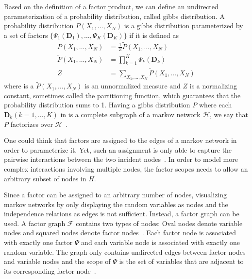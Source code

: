 Based on the definition of a \gls{factor product}, we can define an undirected parameterization of a \gls{probability distribution}, called \gls{gibbs distribution}.
A \gls{probability distribution} $P(X_1,\dots,X_N)$ is a \gls{gibbs distribution} parameterized by a set of \glspl{factor} $\{\Psi_1(\bm{D}_1),\dots,\Psi_K(\bm{D}_K)\}$ if it is defined as~\citep{koller2009probabilistic}
\begin{equation}
  \label{equ:gibbs-distribution}
  \begin{split}
  P(X_1,\dots,X_N) & =\frac{1}{Z}\tilde{P}(X_1,\dots,X_N) \\
  \tilde{P}(X_1,\dots,X_N) & =\prod_{k=1}^{K}\Psi_k(\bm{D}_k) \\
  Z & =\sum_{X_1,\ldots,X_N}\tilde{P}(X_1,\dots,X_N)
  \end{split}
\end{equation}
where is a $\tilde{P}(X_1,\dots,X_N)$ is an unnormalized measure and $Z$ is a normalizing constant, sometimes called the \gls{partitioning function}, which guarantees that the \gls{probability distribution} sums to 1.
Having a \gls{gibbs distribution} $P$ where each $\bm{D}_k(k=1,\dots,K)$ in  is a complete subgraph of a \gls{markov network} $\mathcal{H}$, we say that $P$ factorizes over $\mathcal{H}$~\citep{koller2009probabilistic}.

One could think that \glspl{factor} are assigned to the edges of a \gls{markov network} in order to parameterize it.
Yet, such an assignment is only able to capture the pairwise interactions between the two incident nodes~\citep{koller2009probabilistic}.
In order to model more complex interactions involving multiple nodes, the \glspl{factor scope} needs to allow an arbitrary subset of nodes in $H$.

Since a factor can be assigned to an arbitrary number of nodes, visualizing \glspl{markov network} by only displaying the random variables as nodes and the independence relations as edges is not sufficient.
Instead, a \gls{factor graph} can be used.
A \gls{factor graph} $\mathcal{F}$ contains two types of nodes: Oval nodes denote variable nodes and squared nodes denote factor nodes~\citep{koller2009probabilistic}.
Each factor node is associated with exactly one factor $\Psi$ and each variable node is associated with exactly one random variable.
The graph only contains undirected edges between factor nodes and variable nodes and the scope of $\Psi$ is the set of variables that are adjacent to its corresponding factor node~\citep{koller2009probabilistic}.

